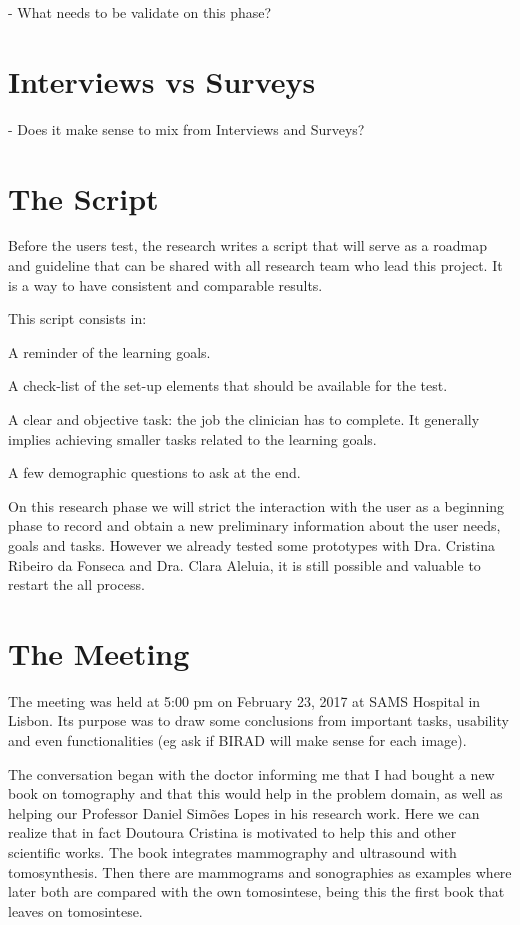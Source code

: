 - What needs to be validate on this phase?

\section{Interviews vs Surveys}

- Does it make sense to mix from Interviews and Surveys?

\section{The Script}

Before the users test, the research writes a script that will serve as a roadmap and guideline that can be shared with all research team who lead this project. It is a way to have consistent and comparable results.

This script consists in:

 A reminder of the learning goals.

 A check-list of the set-up elements that should be available for the test.

 A clear and objective task: the job the clinician has to complete. It generally implies achieving smaller tasks related to the learning goals.

 A few demographic questions to ask at the end.

On this research phase we will strict the interaction with the user as a beginning phase to record and obtain a new preliminary information about the user needs, goals and tasks. However we already tested some prototypes with Dra. Cristina Ribeiro da Fonseca and Dra. Clara Aleluia, it is still possible and valuable to restart the all process.

\clearpage

\section{The Meeting}

The meeting was held at 5:00 pm on February 23, 2017 at SAMS Hospital in Lisbon. Its purpose was to draw some conclusions from important tasks, usability and even functionalities (eg ask if BIRAD will make sense for each image).

The conversation began with the doctor informing me that I had bought a new book on tomography and that this would help in the problem domain, as well as helping our Professor Daniel Simões Lopes in his research work. Here we can realize that in fact Doutoura Cristina is motivated to help this and other scientific works. The book integrates mammography and ultrasound with tomosynthesis. Then there are mammograms and sonographies as examples where later both are compared with the own tomosintese, being this the first book that leaves on tomosintese.

